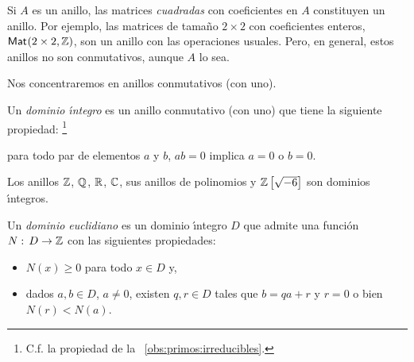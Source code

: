 \begin{ejemEuclidianos}\label{ejem:euclidianos:matrices}
	Si $A$ es un anillo, las matrices \emph{cuadradas} con coeficientes
	en $A$ constituyen un anillo. Por ejemplo, las matrices de tama\~no
	$2\times 2$ con coeficientes enteros, $\mathsf{Mat}_{}(2\times 2,\mathbb{Z})$,
	son un anillo con las operaciones usuales. Pero, en general, estos
	anillos no son conmutativos, aunque $A$ lo sea.
\end{ejemEuclidianos}

Nos concentraremos en anillos conmutativos (con uno).

\begin{defEuclidianos}\label{def:dominio}
	Un \emph{dominio \'{\i}ntegro} es un anillo conmutativo (con uno)
	que tiene la siguiente propiedad:%
	\footnote{
		C.f. la propiedad de la \obsname~\ref{obs:primos:irreducibles}.
	}
	\begin{center}
		para todo par de elementos $a$ y $b$, $ab=0$ implica
			$a=0$ o $b=0$.
	\end{center}
\end{defEuclidianos}

\begin{ejemEuclidianos}\label{ejem:euclidianos:dominio}
	Los anillos $\mathbb{Z}$, $\mathbb{Q}$, $\mathbb{R}$, $\mathbb{C}$,
	sus anillos de polinomios y ${\mathbb{Z}}\left[\sqrt{-6}\right]$ son
	dominios \'{\i}ntegros.
\end{ejemEuclidianos}

\begin{defEuclidianos}\label{def:euclidianos}
	Un \emph{dominio euclidiano} es un dominio \'{\i}ntegro $D$
	que admite una funci\'on $N:\,D\rightarrow\mathbb{Z}$ con las siguientes
	propiedades:
	\begin{itemize}
		\item $N(x)\geq 0$ para todo $x\in D$ y,
		\item dados $a,b\in D$, $a\neq 0$, existen $q,r\in D$ tales
			que $b=qa+r$ y $r=0$ o bien $N(r)<N(a)$.
	\end{itemize}
\end{defEuclidianos}

